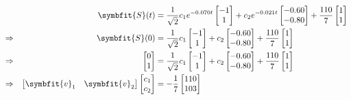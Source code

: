 \begin{align}
  &&\symbfit{S}(t) &= \frac{1}{\sqrt{2}}c_1e^{-0.070t}\begin{bmatrix} -1 \\ 1 \end{bmatrix} 
                 + c_2e^{-0.021t}\begin{bmatrix} -0.60 \\ -0.80 \end{bmatrix}
                 + \frac{110}{7}\begin{bmatrix} 1 \\ 1  \end{bmatrix} \\
  &\Rightarrow& \symbfit{S}(0) &= \frac{1}{\sqrt{2}}c_1\begin{bmatrix} -1 \\ 1 \end{bmatrix} 
                 + c_2\begin{bmatrix} -0.60 \\ -0.80 \end{bmatrix}
                 + \frac{110}{7}\begin{bmatrix} 1 \\ 1  \end{bmatrix} \\
  &\Rightarrow& \begin{bmatrix} 0 \\ 1 \end{bmatrix} &= \frac{1}{\sqrt{2}}c_1\begin{bmatrix} -1 \\ 1 \end{bmatrix} 
                 + c_2\begin{bmatrix} -0.60 \\ -0.80 \end{bmatrix}
                 + \frac{110}{7}\begin{bmatrix} 1 \\ 1  \end{bmatrix} \\
  &\Rightarrow& \begin{bmatrix} \symbfit{v}_1 & \symbfit{v}_2 \end{bmatrix}\begin{bmatrix} c_1 \\ c_2 \end{bmatrix}
                                                      &= -\frac{1}{7}\begin{bmatrix} 110 \\ 103 \end{bmatrix} \\

\end{align}
